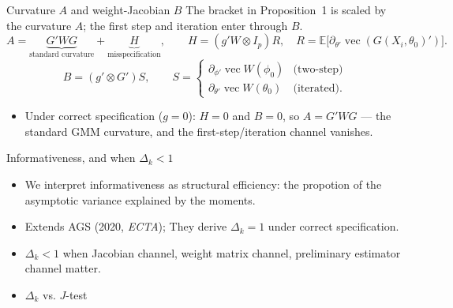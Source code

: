 \documentclass[11pt,aspectratio=169]{beamer}
\newtheorem{coro}{Corollary}
\newcommand{\E}{\mathbb{E}}
\newcommand{\Var}{\operatorname{Var}}
\newcommand{\vect}{\operatorname{vec}}
\begin{document}
\begin{frame}{Curvature $A$ and weight-Jacobian $B$}
    The bracket in Proposition~1 is scaled by the curvature $A$; the first step
    and iteration enter through $B$.
    \[
        A=\underbrace{G'WG}_{\text{standard curvature}}
         +\underbrace{H}_{\text{misspecification}},
        \qquad H=(g'W\otimes I_p)R,\quad
        R=\E\!\big[\partial_{\theta'}\vect(G(X_i,\theta_0)')\big].
    \]
    \[
        B=(g'\otimes G')S,
        \qquad
        S=\begin{cases}
            \partial_{\phi'}\vect W(\phi_0) & \text{(two-step)}\\
            \partial_{\theta'}\vect W(\theta_0) & \text{(iterated)}.
        \end{cases}
    \]
    \begin{itemize}
        \item Under \alert{correct specification} ($g=0$): $H=0$ and $B=0$, so
        $A=G'WG$ --- the standard GMM curvature, and the first-step/iteration
        channel vanishes.
    \end{itemize}
\end{frame}

\begin{frame}{Informativeness, and when $\Delta_k<1$}
    \begin{itemize}
    	\item We interpret informativeness as \alert{structural efficiency}: the propotion of the asymptotic variance explained by the moments.
    	\item Extends AGS (2020, \textit{ECTA}); They derive $\Delta_k=1$ under correct
    	specification.
    	\item $\Delta_k<1$ when Jacobian channel, weight matrix channel, preliminary estimator channel matter.
    	\item $\Delta_k$ vs. $J$-test
    \end{itemize}
\end{frame}
\end{document}
